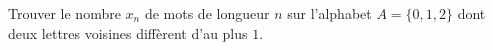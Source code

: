Trouver le nombre $x_n$ de mots de longueur $n$ sur l'alphabet $A = \{0, 1, 2\}$ dont deux lettres voisines diffèrent d'au plus $1$.
